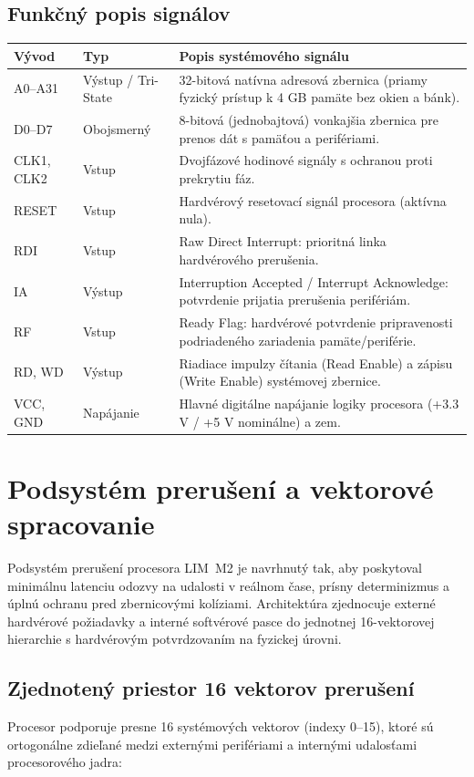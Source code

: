 \documentclass[11pt,a4paper]{article}
\begin{document}
\subsection{Funkčný popis signálov}
\begin{tabularx}{\textwidth}{>{\ttfamily}p{28mm}p{24mm}X}
\toprule
Vývod & Typ & Popis systémového signálu \\
\midrule
A0--A31    & Výstup / Tri-State & 32-bitová natívna adresová zbernica (priamy fyzický prístup k 4 GB pamäte bez okien a bánk). \\
D0--D7     & Obojsmerný         & 8-bitová (jednobajtová) vonkajšia zbernica pre prenos dát s pamäťou a perifériami. \\
CLK1, CLK2 & Vstup              & Dvojfázové hodinové signály s ochranou proti prekrytiu fáz. \\
RESET      & Vstup              & Hardvérový resetovací signál procesora (aktívna nula). \\
RDI        & Vstup              & Raw Direct Interrupt: prioritná linka hardvérového prerušenia. \\
IA         & Výstup             & Interruption Accepted / Interrupt Acknowledge: potvrdenie prijatia prerušenia perifériám. \\
RF         & Vstup              & Ready Flag: hardvérové potvrdenie pripravenosti podriadeného zariadenia pamäte/periférie. \\
RD, WD     & Výstup             & Riadiace impulzy čítania (Read Enable) a zápisu (Write Enable) systémovej zbernice. \\
VCC, GND   & Napájanie          & Hlavné digitálne napájanie logiky procesora (+3.3 V / +5 V nominálne) a zem. \\
\bottomrule
\end{tabularx}

\clearpage
\section{Podsystém prerušení a vektorové spracovanie}

Podsystém prerušení procesora LIM~M2 je navrhnutý tak, aby poskytoval minimálnu latenciu odozvy na udalosti v reálnom čase, prísny determinizmus a úplnú ochranu pred zbernicovými kolíziami. Architektúra zjednocuje externé hardvérové požiadavky a interné softvérové pasce do jednotnej 16-vektorovej hierarchie s hardvérovým potvrdzovaním na fyzickej úrovni.

\subsection{Zjednotený priestor 16 vektorov prerušení}
Procesor podporuje presne 16 systémových vektorov (indexy 0--15), ktoré sú ortogonálne zdieľané medzi externými perifériami a internými udalosťami procesorového jadra:
\end{document}
